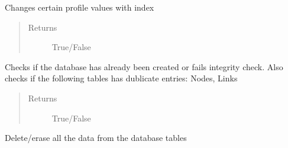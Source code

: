 \documentclass[letterpaper,10pt,english]{sphinxmanual}
\begin{document}
\begin{fulllineitems}
\begin{fulllineitems}
\label{\detokenize{api:beamon.database.Database.change_profile}}
Changes certain profile values with index
\begin{quote}\begin{description}
\item[{Returns}] \leavevmode
True/False

\end{description}\end{quote}

\end{fulllineitems}


\begin{fulllineitems}
\label{\detokenize{api:beamon.database.Database.check_database}}
Checks if the database has already been created or fails integrity check. Also checks if the following tables
has dublicate entries: Nodes, Links
\begin{quote}\begin{description}
\item[{Returns}] \leavevmode
True/False

\end{description}\end{quote}

\end{fulllineitems}


\begin{fulllineitems}
\label{\detokenize{api:beamon.database.Database.clear_database}}
Delete/erase all the data from the database tables

\end{fulllineitems}



\end{fulllineitems}
\end{document}
